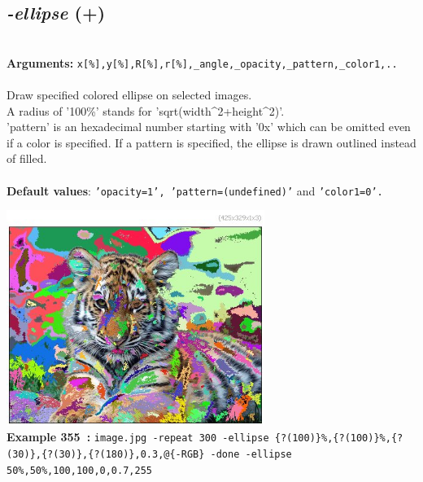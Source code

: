 \documentclass[a4paper,11pt,twoside]{book}
\begin{document}
\subsection{\emph{-ellipse} (+)}\vspace*{-0.5em}
~\\\textbf{Arguments: } 
{\small \texttt{x[\%],y[\%],R[\%],r[\%],\_angle,\_opacity,\_pattern,\_color1,..}}\\~\\
Draw specified colored ellipse on selected images.
~\\A radius of '100\%' stands for 'sqrt(width\textasciicircum 2+height\textasciicircum 2)'.
~\\'pattern' is an hexadecimal number starting with '0x' which can be omitted
even if a color is specified. If a pattern is specified, the ellipse is
drawn outlined instead of filled.
~\\~\\\textbf{Default values}: {\small \texttt{'opacity=1', 'pattern=(undefined)'} and \texttt{'color1=0'.}}
\begin{center}\includegraphics[keepaspectratio=true,height=7cm,width=\textwidth]{img/gmic_def355.jpg}\\
{\footnotesize \textbf{Example 355~:} \texttt{image.jpg -repeat 300 -ellipse \{?(100)\}\%,\{?(100)\}\%,\{?(30)\},\{?(30)\},\{?(180)\},0.3,@\{-RGB\} -done -ellipse 50\%,50\%,100,100,0,0.7,255}}
\end{center}
\end{document}
